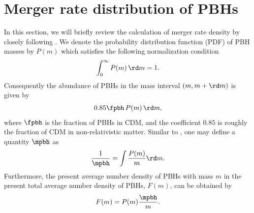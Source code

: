 \documentclass[
reprint,           %
superscriptaddress,%
amsmath,           %
amssymb,           %
aps,               %
prd,               %
notitlepage,       %
longbibliography,  %
floatfix,          %
showkeys,          %
]{revtex4-1}
\def\e{\begin{equation}}
\def\q{\end{equation}}
\begin{document}
\section{\label{merger}Merger rate distribution of PBHs}
In this section, we will briefly review the calculation of merger rate density
by closely following \cite{Liu:2019rnx}.
We denote the probability distribution function (PDF) of PBH masses by $P(m)$
which satisfies the following normalization condition
\e\label{norm}
    \int_{0}^{\infty} P(m)\, \rd m = 1.
\q 
Consequently the abundance of PBHs in the mass interval $(m, m+\rd m)$ is given 
by \cite{Chen:2018rzo}
\e 
    0.85 \fpbh\, P(m)\, \rd m,
\q 
where $\fpbh$ is the fraction of PBHs in CDM, and the coefficient $0.85$ is roughly the fraction of CDM in non-relativistic matter.
Similar to \cite{Liu:2019rnx}, one may define a quantity $\mpbh$ as
\e\label{mpbh}
    \frac{1}{\mpbh} = \int \frac{P(m)}{m} \rd m.
\q 
Furthermore, the present average number density of PBHs with mass $m$ in the 
present total average number density of PBHs, $F(m)$, can be obtained by
\cite{Liu:2019rnx}
\e\label{Fm} 
    F(m) = P(m) \frac{\mpbh}{m}.
\q 
\end{document}
